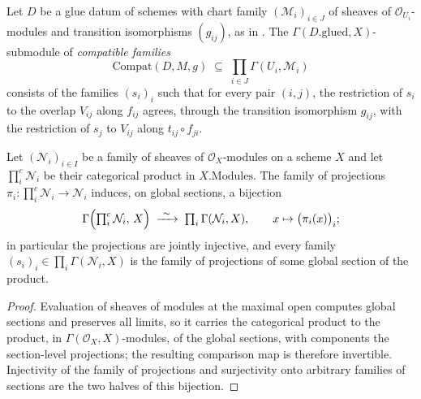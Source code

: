 \begin{definition}
  \label{def:glue_gamma_compatible}
  \leanok
  Let \(D\) be a glue datum of schemes with chart family
  \((\mathcal M_i)_{i \in J}\) of sheaves of \(\mathcal O_{U_i}\)-modules and
  transition isomorphisms \((g_{ij})\), as in .
  The \(\Gamma(D.\mathrm{glued}, X)\)-submodule of \emph{compatible families}
  \[
    \mathrm{Compat}(D, M, g) \;\subseteq\; \prod_{i \in J} \Gamma(U_i, \mathcal M_i)
  \]
  consists of the families \((s_i)_i\) such that for every pair \((i,j)\),
  the restriction of \(s_i\) to the overlap \(V_{ij}\) along \(f_{ij}\)
  agrees, through the transition isomorphism \(g_{ij}\), with the
  restriction of \(s_j\) to \(V_{ij}\) along \(t_{ij} \circ f_{ji}\).
\end{definition}

\begin{lemma}
  \label{lem:gamma_pi_sections}
  \leanok
  Let \((\mathcal N_i)_{i \in I}\) be a family of sheaves of
  \(\mathcal O_X\)-modules on a scheme \(X\) and let
  \(\textstyle\prod^{c}_i \mathcal N_i\) be their categorical product in
  \(X.\mathrm{Modules}\). The family of projections
  \(\pi_i : \prod^{c}_i \mathcal N_i \to \mathcal N_i\) induces, on global
  sections, a bijection
  \[
    \Gamma\Bigl(\textstyle\prod^{c}_i \mathcal N_i,\, X\Bigr)
      \;\xrightarrow{\ \sim\ }\; \prod_i \Gamma(\mathcal N_i, X), \qquad
    x \mapsto \bigl(\pi_i(x)\bigr)_i;
  \]
  in particular the projections are jointly injective, and every family
  \((s_i)_i \in \prod_i \Gamma(\mathcal N_i, X)\) is the family of
  projections of some global section of the product.
\end{lemma}
\begin{proof}\leanok
  Evaluation of sheaves of modules at the maximal open computes global
  sections and preserves all limits, so it carries the categorical product
  to the product, in \(\Gamma(\mathcal O_X, X)\)-modules, of the global
  sections, with components the section-level projections; the resulting
  comparison map is therefore invertible. Injectivity of the family of
  projections and surjectivity onto arbitrary families of sections are the
  two halves of this bijection.
\end{proof}


